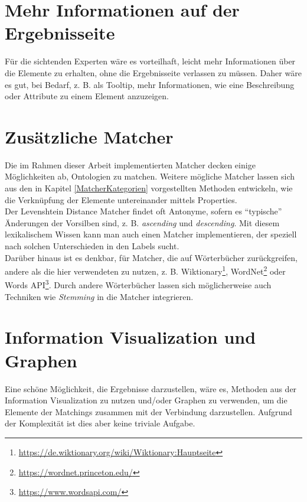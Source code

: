 \section{Mehr Informationen auf der Ergebnisseite}
Für die sichtenden Experten wäre es vorteilhaft, leicht mehr Informationen über
die Elemente zu erhalten, ohne die Ergebnisseite verlassen zu müssen. Daher wäre
es gut, bei Bedarf, z. B. als Tooltip, mehr Informationen, wie eine Beschreibung
oder Attribute zu einem Element anzuzeigen.

\section{Zusätzliche Matcher}
Die im Rahmen dieser Arbeit implementierten Matcher decken einige Möglichkeiten
ab, Ontologien zu matchen. Weitere mögliche Matcher lassen sich aus den in
Kapitel \ref{MatcherKategorien} vorgestellten Methoden entwickeln, wie die
Verknüpfung der Elemente untereinander mittels Properties.\\
Der Levenshtein Distance Matcher findet oft Antonyme, sofern es
"`typische"' Änderungen der Vorsilben sind, z. B. \textit{ascending}
und \textit{descending}. Mit diesem lexikalischem Wissen kann man auch einen
Matcher implementieren, der speziell nach solchen Unterschieden in den Labels
sucht.\\
Darüber hinaus ist es denkbar, für Matcher, die auf Wörterbücher
zurückgreifen, andere als die hier verwendeten zu nutzen, z. B.
Wiktionary\footnote{\url{https://de.wiktionary.org/wiki/Wiktionary:Hauptseite}},
WordNet\footnote{\url{https://wordnet.princeton.edu/}} oder Words
API\footnote{\url{https://www.wordsapi.com/}}. Durch andere Wörterbücher
lassen sich möglicherweise auch Techniken wie \textit{Stemming} in die Matcher
integrieren.\\

\section{Information Visualization und Graphen}
Eine schöne Möglichkeit, die Ergebnisse darzustellen, wäre es, Methoden aus der
Information Visualization zu nutzen und/oder Graphen zu verwenden, um die
Elemente der Matchings zusammen mit der Verbindung darzustellen. Aufgrund der
Komplexität ist dies aber keine triviale Aufgabe.

\cleardoublepage
\pagebreak[4]
